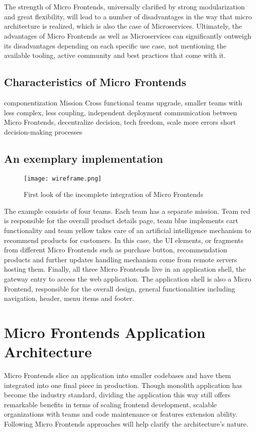 \documentclass[a4paper]{book}
\begin{document}
\\ \\
The strength of Micro Frontends, universally clarified by strong modularization and great flexibility, will lead to a number of disadvantages in the way that micro architecture is realized, which is also the case of Microservices. Ultimately, the advantages of Micro Frontends as well as Microservices can significantly outweigh its disadvantages depending on each specific use case, not mentioning the available tooling, active community and best practices that come with it. 

\section{Characteristics of Micro Frontends}
componentization 
Mission
Cross functional teams
upgrade, smaller teams with less complex, less coupling, independent deployment communication between Micro Frontends, decentralize decision, tech freedom, scale 
more errors
short decision-making processes 
\section{An exemplary implementation}

\begin{figure}[h!]
    \centering
    \captionsetup{justification=centering}
    \texttt{[image: wireframe.png]}
    \caption{First look of the incomplete integration of Micro Frontends}
    \label{fig:wireframe}
\end{figure}

The example consists of four teams. Each team has a separate mission. Team red is responsible for the overall product details page, team blue implements cart functionality and team yellow takes care of an artificial intelligence mechanism to recommend products for customers. In this case, the UI elements, or fragments from different Micro Frontends such as purchase button, recommendation products and further updates handling mechanism come from remote servers hosting them. Finally, all three Micro Frontends live in an application shell, the gateway entry to access the web application. The application shell is also a Micro Frontend, responsible for the overall design, general functionalities including navigation, header, menu items and footer.

\chapter{Micro Frontends Application Architecture}
Micro Frontends slice an application into smaller codebases and have them integrated into one final piece in production. Though monolith application has become the industry standard, dividing the application this way still offers remarkable benefits in terms of scaling frontend development, scalable organizations with teams and code maintenance or features extension ability. Following Micro Frontends approaches will help clarify the architecture’s nature.
\end{document}
